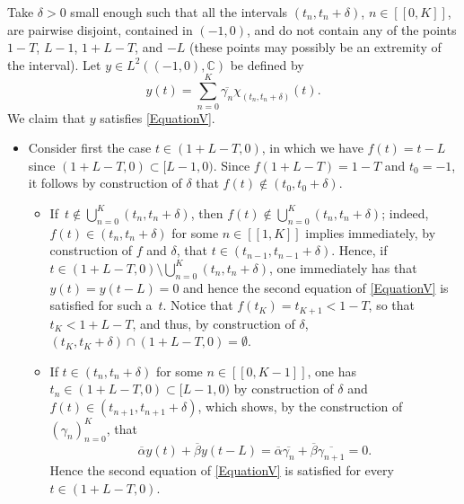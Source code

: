 \documentclass[JEP,XML,SOM,Unicode]{cedram}
\newcommand{\llbracket}{[\![}
\newcommand{\rrbracket}{]\!]}
\theoremstyle{plain}
\theoremstyle{definition}
\begin{document}
Take $\delta > 0$ small enough such that all the intervals $(t_n, t_n + \delta)$, $n \in \llbracket 0, K\rrbracket$, are pairwise disjoint, contained in $(-1, 0)$, and do not contain any of the points $1 - T$, $L - 1$, $1 + L - T$, and $-L$ (these points may possibly be an extremity of the interval). Let $y \in L^2((-1, 0), \mathbb C)$ be defined by
\begin{equation}
\label{DefV}
y(t) = \sum_{n=0}^K \overline{\gamma_n} \chi_{(t_n, t_n + \delta)}(t).
\end{equation}
We claim that $y$ satisfies \eqref{EquationV}.
\begin{itemize}
\item
Consider first the case $t \in (1 + L - T, 0)$, in which we have $f(t) = t - L$ since $(1 + L - T, 0) \subset [L - 1, 0)$. Since $f(1 + L - T) = 1 - T$ and $t_0 = -1$, it follows by construction of $\delta$ that $f(t) \notin (t_0, t_0 + \delta)$.
\begin{itemize}
\item
If~\hbox{$t \!\notin\! \bigcup_{n=0}^K (t_n, t_n + \delta)$}, then $f(t) \!\notin\! \bigcup_{n=0}^K (t_n, t_n + \delta)$; indeed, $f(t) \!\in\! (t_n, t_n + \delta)$ for some $n \in \llbracket 1, K\rrbracket$ implies immediately, by construction of $f$ and $\delta$, that \hbox{$t \in (t_{n-1}, t_{n-1} + \delta)$}. Hence, if \hbox{$t \in (1 + L - T, 0) \setminus \bigcup_{n=0}^K (t_n, t_n + \delta)$}, one immediately has that \hbox{$y(t) = y(t - L) = 0$} and hence the second equation of \eqref{EquationV} is satisfied for such a~$t$. Notice that $f(t_K) = t_{K+1} < 1 - T$, so that $t_K < 1 + L - T$, and thus, by construction of $\delta$, \hbox{$(t_K, t_K + \delta) \cap (1 + L - T, 0) = \emptyset$}.
\item
If $t \in (t_n, t_n + \delta)$ for some $n \in \llbracket 0, K - 1\rrbracket$, one has $t_n \in (1 + L - T, 0) \subset [L - 1, 0)$ by construction of $\delta$ and $f(t) \in (t_{n+1}, t_{n+1} + \delta)$, which shows, by the construction of $(\gamma_n)_{n=0}^K$, that
\[
\overline\alpha y(t) + \overline\beta y(t - L) = \overline\alpha \overline{\gamma_n} + \overline\beta \overline{\gamma_{n+1}} = 0.
\]
Hence the second equation of \eqref{EquationV} is satisfied for every $t \in (1 + L - T, 0)$.
\end{itemize}


\end{itemize}
\end{document}
